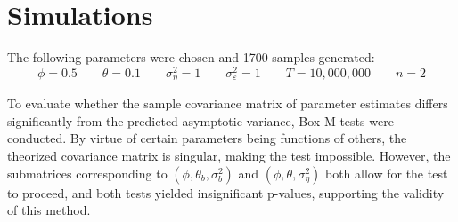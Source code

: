 \section{Simulations}
The following parameters were chosen and 1700 samples generated:
$$\phi = 0.5 \qquad \theta = 0.1 \qquad \sigma_\eta^2 = 1 \qquad \sigma_\varepsilon^2 = 1 \qquad T = 10,000,000 \qquad n = 2$$

To evaluate whether the sample covariance matrix of parameter estimates differs significantly from the predicted asymptotic variance, Box-M tests were conducted. By virtue of certain parameters being functions of others, the theorized covariance matrix is singular, making the test impossible. However, the submatrices corresponding to $(\phi, \theta_b, \sigma_b^2)$ and $(\phi, \theta, \sigma_\eta^2)$ both allow for the test to proceed, and both tests yielded insignificant p-values, supporting the validity of this method. 
